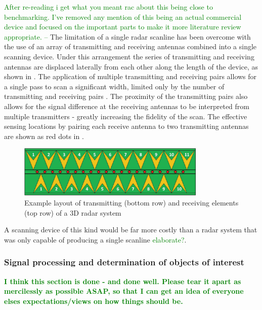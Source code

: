 \documentclass[main.tex]{subfiles}
\begin{document}
\textcolor{green}{After re-reading i get what you meant rac about this being close to benchmarking. I've removed any mention of this being an actual commercial device and focused on the important parts to make it more literature review appropriate. --}
The limitation of a single radar scanline has been overcome with the use of an array of transmitting and receiving antennas combined into a single scanning device. Under this arrangement the series of transmitting and receiving antennas are displaced laterally from each other along the length of the device, as shown in . The application of multiple transmitting and receiving pairs allows for a single pass to scan a significant width, limited only by the number of transmitting and receiving pairs \parencite{3dradarDX}. The proximity of the transmitting pairs also allows for the signal difference at the receiving antennas to be interpreted from multiple transmitters - greatly increasing the fidelity of the scan. The effective sensing locations by pairing each receive antenna to two transmitting antennas are shown as red dots in .
\begin{figure}[ht]
\includegraphics[width=0.8\textwidth]{3-LiteratureReview/3d-radar.png}
\centering
\caption[Example layout of transmitting (bottom row) and receiving elements (top row) of a 3D radar system]{Example layout of transmitting (bottom row) and receiving elements (top row) of a 3D radar system \parencite{3dradarDXG}} 
\end{figure}
A scanning device of this kind would be far more costly than a radar system that was only capable of producing a single scanline \textcolor{green}{elaborate?}.

\subsubsection{Signal processing and determination of objects of interest}
\textbf{\textcolor{green}{I think this section is done - and done well. Please tear it apart as mercilessly as possible ASAP, so that I can get an idea of everyone elses expectations/views on how things should be.}}
\end{document}
